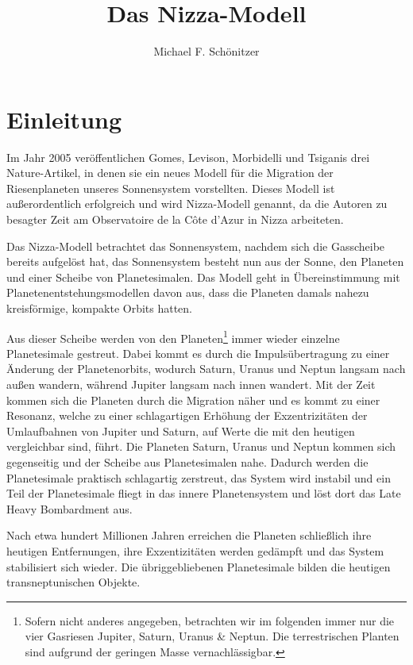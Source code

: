 \documentclass[12pt,a4paper,twoside]{article}
\author{Michael F. Schönitzer}
\title{Das Nizza-Modell}
\renewcommand{\cite}{\citep}
\begin{document}
\maketitle

\section{Einleitung}
Im Jahr 2005 veröffentlichen Gomes, Levison, Morbidelli und Tsiganis drei Nature-Artikel\cite{Tsiganis2005,Morbidelli2005,Gomes2005},
in denen sie ein neues Modell für die Migration der Riesenplaneten unseres Sonnensystem vorstellten. Dieses Modell ist außerordentlich erfolgreich und wird Nizza-Modell genannt, da die Autoren zu besagter Zeit am Observatoire de la Côte d’Azur in Nizza arbeiteten.

Das Nizza-Modell betrachtet das Sonnensystem, nachdem sich die Gasscheibe bereits aufgelöst hat, das Sonnensystem besteht nun aus der Sonne, den Planeten und einer Scheibe von Planetesimalen. Das Modell geht in Übereinstimmung mit Planetenentstehungsmodellen davon aus, dass die Planeten damals nahezu kreisförmige, kompakte Orbits hatten.

Aus dieser Scheibe werden von den Planeten\footnote{Sofern nicht anderes angegeben, betrachten wir im folgenden immer nur die vier Gasriesen Jupiter, Saturn, Uranus \& Neptun. Die terrestrischen Planten sind aufgrund der geringen Masse vernachlässigbar.} immer wieder einzelne Planetesimale gestreut.
Dabei kommt es durch die Impulsübertragung zu einer Änderung der Planeten\-orbits\cite{Tsiganis2005},
wodurch Saturn, Uranus und Neptun langsam nach außen wandern, während Jupiter langsam nach innen wandert\cite{Hahn1999,Tsiganis2005}.
Mit der Zeit kommen sich die Planeten durch die Migration näher und es kommt zu einer Resonanz,
welche zu einer schlagartigen Erhöhung der Exzentrizitäten der Umlaufbahnen von Jupiter und Saturn, auf Werte die mit den heutigen vergleichbar sind, führt.
Die Planeten Saturn, Uranus und Neptun kommen sich gegenseitig und der Scheibe aus Planetesimalen nahe. Dadurch werden die Planetesimale praktisch schlagartig zerstreut, das System wird instabil und ein Teil der Planetesimale fliegt in das innere Planetensystem und löst dort das Late Heavy Bombardment aus.

Nach etwa hundert Millionen Jahren erreichen die Planeten schließlich ihre heutigen Entfernungen, ihre Exzentizitäten werden gedämpft und das System stabilisiert sich wieder. Die übriggebliebenen Planetesimale bilden die heutigen transneptunischen Objekte.
\end{document}
